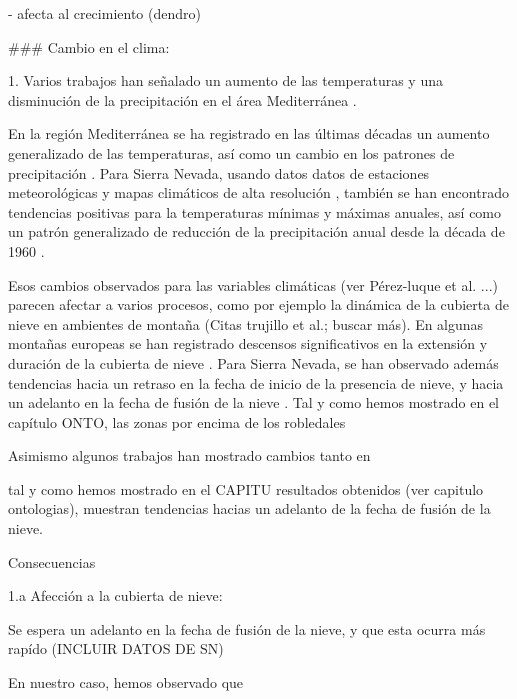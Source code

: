 - afecta al crecimiento (dendro)

### Cambio en el clima: 

1. Varios trabajos han señalado un aumento de las temperaturas y una disminución de la precipitación en el área Mediterránea \autocites{GarciaRuizetal2011MediterraneanWater,GiorgiLionello2008ClimateChange}. 

En la región Mediterránea se ha registrado en las últimas décadas un aumento generalizado de las temperaturas, así como un cambio en los patrones de precipitación \autocites{PerezBoscolo2010ClimateSpain,GiorgiLionello2008ClimateChange,Crameretal2020ClimateEnvironmental}. Para Sierra Nevada, usando datos datos de estaciones meteorológicas y mapas climáticos de alta resolución \autocites{Benitoetal2014ClimateSimulations}, también se han encontrado tendencias positivas para la temperaturas mínimas y máximas anuales, así como un patrón generalizado de reducción de la precipitación anual desde la década de 1960 \autocites{PerezLuqueetal2016SenalesCambio,PerezLuqueetal2021ClimaNevadaBase}. 


Esos cambios observados para las variables climáticas (ver Pérez-luque et al. ...) parecen afectar a varios procesos, como por ejemplo la dinámica de la cubierta de nieve en ambientes de montaña (Citas trujillo et al.; buscar más). En algunas montañas europeas se han registrado descensos significativos en la extensión y duración de la cubierta de nieve \autocite{Marty2008RegimeShift,MorenoRodriguezetal2005EvaluacionPreliminar,Nikolovaetal2013ChangesSnowfall,Scherreretal2004TrendsSwiss}. Para Sierra Nevada, se han observado además tendencias hacia un retraso en la fecha de inicio de la presencia de nieve, y hacia un adelanto en la fecha de fusión de la nieve \autocites{PerezLuqueetal2016SenalesCambio}. Tal y como hemos mostrado en el capítulo ONTO, las zonas por encima de los robledales 

Asimismo algunos trabajos han mostrado cambios tanto en

tal y como hemos mostrado en el CAPITU resultados obtenidos (ver capitulo ontologias), muestran tendencias hacias un adelanto de la fecha de fusión de la nieve. 



Consecuencias 

1.a Afección a la cubierta de nieve: 

 Se espera un adelanto en la fecha de fusión de la nieve, y que esta ocurra más rapído (INCLUIR DATOS DE SN) 

En nuestro caso, hemos observado que  

